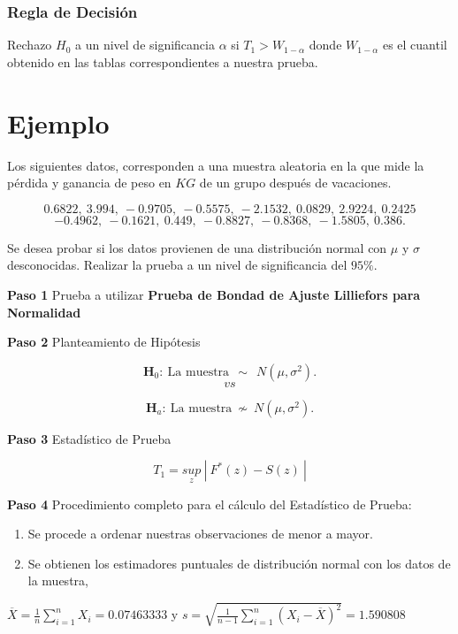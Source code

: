 \documentclass[
  a4paper,
  oneside,
  openany]{book}
\begin{document}
\hypertarget{regla-de-decisiuxf3n-32}{%
\subsubsection*{Regla de Decisión}\label{regla-de-decisiuxf3n-32}}


Rechazo \(H_0\) a un nivel de significancia \(\alpha\) si \(T_{1}> W_{1-\alpha}\) donde \(W_{1-\alpha}\) es el cuantil obtenido en las tablas correspondientes a nuestra prueba.

\hypertarget{ejemplo-15}{%
\section{Ejemplo}\label{ejemplo-15}}

Los siguientes datos, corresponden a una muestra aleatoria en la que mide la pérdida y ganancia de peso en \(KG\) de un grupo después de vacaciones.

\[0.6822,\ 3.994,\ -0.9705,\ -0.5575,\ -2.1532,\ 0.0829,\ 2.9224,\ 0.2425\]
\[-0.4962,\ -0.1621,\ 0.449,\ -0.8827,\ -0.8368,\ -1.5805,\ 0.386.\]

Se desea probar si los datos provienen de una distribución normal con \(\mu\) y \(\sigma\) desconocidas.
Realizar la prueba a un nivel de significancia del \(95\%.\)

\textbf{Paso 1} Prueba a utilizar \textbf{Prueba de Bondad de Ajuste Lilliefors para Normalidad}

\textbf{Paso 2} Planteamiento de Hipótesis

\[\textbf{H}_0: \ \mbox{La muestra} \ \ \sim \ \  N(\mu,\sigma^2).\]
\[vs\]

\[\textbf{H}_a: \ \mbox{La muestra}  \ \nsim \  N(\mu,\sigma^2).\]

\textbf{Paso 3} Estadístico de Prueba

\[T_{1}=\underset{z}{sup} \ | \ F^*(z)-S(z) \ |\]

\textbf{Paso 4} Procedimiento completo para el cálculo del Estadístico de Prueba:

\begin{enumerate}
\def\labelenumi{\arabic{enumi})}
\item
  Se procede a ordenar nuestras observaciones de menor a mayor.
\item
  Se obtienen los estimadores puntuales de distribución normal con los datos de la muestra,
\end{enumerate}

\(\overline{X}=\frac{1}{n}\sum_{i=1}^{n}X_{i}= 0.07463333\) y \(s=\sqrt{\frac{1}{n-1}\sum_{i=1}^{n}(X_{i}-\overline{X})^2}=1.590808\)
\end{document}
